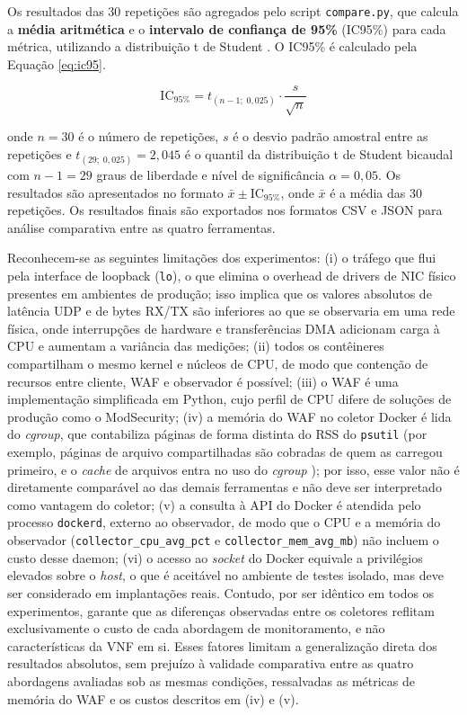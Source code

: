 Os resultados das 30 repetições são agregados pelo script \texttt{compare.py}, que calcula a \textbf{média aritmética} e o \textbf{intervalo de confiança de 95\%} (IC95\%) para cada métrica, utilizando a distribuição t de Student \cite{marconi2017}. O IC95\% é calculado pela Equação \ref{eq:ic95}.

\begin{equation}
\text{IC}_{95\%} = t_{(n-1;\;0{,}025)} \cdot \frac{s}{\sqrt{n}}
\label{eq:ic95}
\end{equation}

\noindent onde $n = 30$ é o número de repetições, $s$ é o desvio padrão amostral entre as repetições e $t_{(29;\;0{,}025)} = 2{,}045$ é o quantil da distribuição t de Student bicaudal com $n - 1 = 29$ graus de liberdade e nível de significância $\alpha = 0{,}05$. Os resultados são apresentados no formato $\bar{x} \pm \text{IC}_{95\%}$, onde $\bar{x}$ é a média das 30 repetições. Os resultados finais são exportados nos formatos CSV e JSON para análise comparativa entre as quatro ferramentas.

Reconhecem-se as seguintes limitações dos experimentos: (i) o tráfego que flui pela interface de loopback (\texttt{lo}), o que elimina o overhead de drivers de NIC físico presentes em ambientes de produção; isso implica que os valores absolutos de latência UDP e de bytes RX/TX são inferiores ao que se observaria em uma rede física, onde interrupções de hardware e transferências DMA adicionam carga à CPU e aumentam a variância das medições; (ii) todos os contêineres compartilham o mesmo kernel e núcleos de CPU, de modo que contenção de recursos entre cliente, WAF e observador é possível; (iii) o WAF é uma implementação simplificada em Python, cujo perfil de CPU difere de soluções de produção como o ModSecurity; (iv) a memória do WAF no coletor Docker é lida do \textit{cgroup}, que contabiliza páginas de forma distinta do RSS do \texttt{psutil} (por exemplo, páginas de arquivo compartilhadas são cobradas de quem as carregou primeiro, e o \textit{cache} de arquivos entra no uso do \textit{cgroup} \cite{kernel_cgroup_v2}); por isso, esse valor não é diretamente comparável ao das demais ferramentas e não deve ser interpretado como vantagem do coletor; (v) a consulta à API do Docker é atendida pelo processo \texttt{dockerd}, externo ao observador, de modo que o CPU e a memória do observador (\texttt{collector\_cpu\_avg\_pct} e \texttt{collector\_mem\_avg\_mb}) não incluem o custo desse daemon; (vi) o acesso ao \textit{socket} do Docker equivale a privilégios elevados sobre o \textit{host}, o que é aceitável no ambiente de testes isolado, mas deve ser considerado em implantações reais. Contudo, por ser idêntico em todos os experimentos, garante que as diferenças observadas entre os coletores reflitam exclusivamente o custo de cada abordagem de monitoramento, e não características da VNF em si. Esses fatores limitam a generalização direta dos resultados absolutos, sem prejuízo à validade comparativa entre as quatro abordagens avaliadas sob as mesmas condições, ressalvadas as métricas de memória do WAF e os custos descritos em (iv) e (v).
